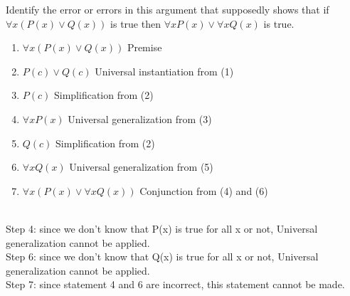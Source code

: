 \documentclass[a4paper]{exam}
\begin{document}
\begin{questions}
  \question  Identify the error or errors in this argument that supposedly shows that if $\forall x(P(x) \lor Q(x))$ is true then $\forall x P(x) \lor \forall x Q(x)$ is true.
\begin{enumerate}
    \item $\forall x(P(x) \lor Q(x))$ \hfill Premise
    \item $P(c) \lor Q(c)$ \hfill Universal instantiation from (1)
    \item $P(c)$ \hfill Simplification from (2)
    \item $\forall x P(x)$ \hfill Universal generalization from (3)
    \item $Q(c)$ \hfill Simplification from (2)
    \item $\forall x Q(x)$ \hfill Universal generalization from (5)
    \item $\forall x(P(x) \lor \forall x Q(x))$ \hfill Conjunction from (4) and (6)
\end{enumerate}
  \begin{solution}\\
    Step 4: since we don't know that P(x) is true for all x or not, Universal generalization cannot be applied.\\
    Step 6: since we don't know that Q(x) is true for all x or not, Universal generalization cannot be applied.\\
    Step 7: since statement 4 and 6 are incorrect, this statement cannot be made.
  \end{solution}
  

\end{questions}
\end{document}
